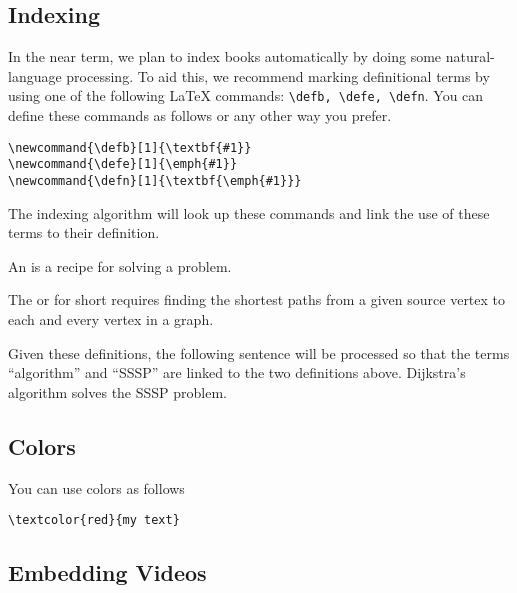 \subsection{Indexing}

\begin{flex}
In the near term, we plan to index books automatically by doing some natural-language processing.  
%
To aid this, we recommend marking definitional terms by using one of the following LaTeX commands: \lstinline`\defb, \defe, \defn`.  You can define these commands as follows or any other way you prefer.
%
\begin{lstlisting}
\newcommand{\defb}[1]{\textbf{#1}}
\newcommand{\defe}[1]{\emph{#1}}
\newcommand{\defn}[1]{\textbf{\emph{#1}}}
\end{lstlisting}
%
The indexing algorithm will look up these commands and link the use of these terms to their definition.

\begin{example}
\begin{definition}[Algorithm]
\label{def:algorithm}
An  is a recipe for solving a problem.
\end{definition}


\begin{definition}
\label{def:sssp}
The  or  for short requires finding  the shortest paths from a given source vertex to each and every vertex in a graph. 
\end{definition}

Given these definitions, the following sentence will be processed so that the terms ``algorithm'' and ``SSSP'' are linked to the two definitions above.
%
Dijkstra's algorithm solves the SSSP problem.
\end{example}
\end{flex}

\subsection{Colors}

You can use colors as follows
\begin{lstlisting}
\textcolor{red}{my text}
\end{lstlisting}


\subsection{Embedding Videos}

